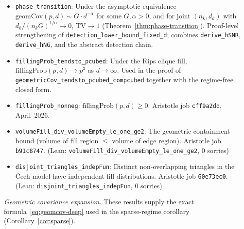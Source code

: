 \documentclass[reqno,12pt]{amsart}
\newcommand{\TV}{\mathrm{TV}}
\newcommand{\geomCov}{\mathrm{geomCov}}
\newcommand{\fillingP}{\mathrm{fillingProb}}
\newcommand{\lean}[1]{\textup{\texttt{\small #1}}}
\newcommand{\leanverified}[1]{\textup{(Lean: \texttt{#1}, 0 sorries)}}
\theoremstyle{plain}
\theoremstyle{definition}
\theoremstyle{remark}
\begin{document}
\begin{itemize}[leftmargin=*, itemsep=4pt]
\item \lean{phase\_transition}: Under the asymptotic equivalence
  $\geomCov(p,d) \sim G \cdot d^{-\alpha}$ for some $G, \alpha > 0$, and for joint
  $(n_k, d_k)$ with $d_k / (n_k G)^{1/\alpha} \to 0$, $\TV \to 1$
  (Theorem~\ref{thm:phase-transition}). Proof-level strengthening of
  \lean{detection\_lower\_bound\_fixed\_d}; combines \lean{derive\_hSNR},
  \lean{derive\_hNG}, and the abstract detection chain.

\item \lean{fillingProb\_tendsto\_pcubed}: Under the Rips clique fill,
  $\fillingP(p,d) \to p^3$ as $d \to \infty$. Used in the proof of
  \lean{geometricCov\_tendsto\_pcubed\_compcubed} together with the regime-free closed
  form.

\item \lean{fillingProb\_nonneg}: $\fillingP(p,d)\geq 0$. Aristotle job \texttt{cff9a2dd},
  April~2026.

\item \lean{volumeFill\_div\_volumeEmpty\_le\_one\_ge2}: The geometric containment bound
  (volume of fill region $\leq$ volume of edge region). Aristotle job \texttt{b91c8747}.
  \leanverified{volumeFill\_div\_volumeEmpty\_le\_one\_ge2}

\item \lean{disjoint\_triangles\_indepFun}: Distinct non-overlapping triangles in the \v{C}ech
  model have independent fill distributions. Aristotle job \texttt{60e73ec0}.
  \leanverified{disjoint\_triangles\_indepFun}
\end{itemize}

\smallskip\noindent\textit{Geometric covariance expansion.}
These results supply the exact formula~\eqref{eq:geomcov-deep} used in the sparse-regime
corollary (Corollary~\ref{cor:sparse}).
\end{document}
